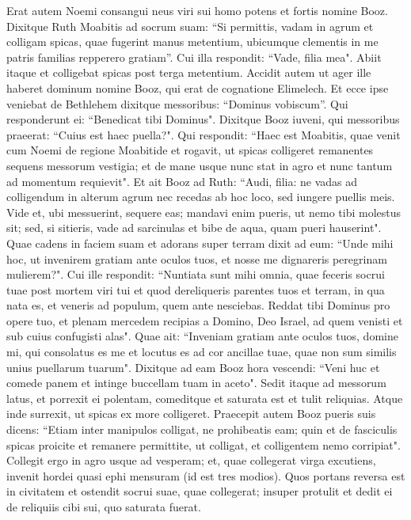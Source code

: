 \begin{biblechapter}  
\verse Erat autem Noemi consangui neus viri sui homo potens et fortis nomine Booz. 
\verse Dixitque Ruth Moabitis ad socrum suam: “Si permittis, vadam in agrum et colligam spicas, quae fugerint manus metentium, ubicumque clementis in me patris familias repperero gratiam”. Cui illa respondit: “Vade, filia mea". 
\verse Abiit itaque et colligebat spicas post terga metentium. Accidit autem ut ager ille haberet dominum nomine Booz, qui erat de cognatione Elimelech. 
\verse Et ecce ipse veniebat de Bethlehem dixitque messoribus: “Dominus vobiscum”. Qui responderunt ei: “Benedicat tibi Dominus". 
\verse Dixitque Booz iuveni, qui messoribus praeerat: “Cuius est haec puella?". 
\verse Qui respondit: “Haec est Moabitis, quae venit cum Noemi de regione Moabitide 
\verse et rogavit, ut spicas colligeret remanentes sequens messorum vestigia; et de mane usque nunc stat in agro et nunc tantum ad momentum requievit". 
\verse Et ait Booz ad Ruth: “Audi, filia: ne vadas ad colligendum in alterum agrum nec recedas ab hoc loco, sed iungere puellis meis. 
\verse Vide et, ubi messuerint, sequere eas; mandavi enim pueris, ut nemo tibi molestus sit; sed, si sitieris, vade ad sarcinulas et bibe de aqua, quam pueri hauserint". 
\verse Quae cadens in faciem suam et adorans super terram dixit ad eum: “Unde mihi hoc, ut invenirem gratiam ante oculos tuos, et nosse me dignareris peregrinam mulierem?". 
\verse Cui ille respondit: “Nuntiata sunt mihi omnia, quae feceris socrui tuae post mortem viri tui et quod dereliqueris parentes tuos et terram, in qua nata es, et veneris ad populum, quem ante nesciebas. 
\verse Reddat tibi Dominus pro opere tuo, et plenam mercedem recipias a Domino, Deo Israel, ad quem venisti et sub cuius confugisti alas". 
\verse Quae ait: “Inveniam gratiam ante oculos tuos, domine mi, qui consolatus es me et locutus es ad cor ancillae tuae, quae non sum similis unius puellarum tuarum". 
\verse Dixitque ad eam Booz hora vescendi: “Veni huc et comede panem et intinge buccellam tuam in aceto". Sedit itaque ad messorum latus, et porrexit ei polentam, comeditque et saturata est et tulit reliquias. 
\verse Atque inde surrexit, ut spicas ex more colligeret. Praecepit autem Booz pueris suis dicens: “Etiam inter manipulos colligat, ne prohibeatis eam; 
\verse quin et de fasciculis spicas proicite et remanere permittite, ut colligat, et colligentem nemo corripiat". 
\verse Collegit ergo in agro usque ad vesperam; et, quae collegerat virga excutiens, invenit hordei quasi ephi mensuram (id est tres modios). 
\verse Quos portans reversa est in civitatem et ostendit socrui suae, quae collegerat; insuper protulit et dedit ei de reliquiis cibi sui, quo saturata fuerat. 

\end{biblechapter}

